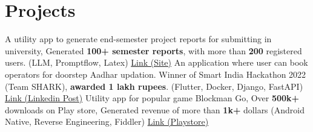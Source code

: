 \section{Projects}
  \resumeSubHeadingListStart
      {A utility app to generate end-semester project reports for submitting in university, Generated \textbf{100+ semester reports}, with more than \textbf{200} registered users. (LLM, Promptflow, Latex) \href{https://tietprojgen.skullzbones.com}{Link (Site)}}
      {An application where user can book operators for doorstep Aadhar updation. Winner of Smart India Hackathon 2022 (Team SHARK), \textbf{awarded 1 lakh rupees}. (Flutter, Docker, Django, FastAPI) \href{https://www.linkedin.com/posts/hsk4link_sih-sih2022-smartindiahackathon-activity-6970324738409672704-YcQA/}{Link (Linkedin Post)}}
      {Utility app for popular game Blockman Go, Over \textbf{500k+} downloads on Play store, Generated revenue of more than \textbf{1k+} dollars (Android Native, Reverse Engineering, Fiddler) \href{https://play.google.com/store/apps/details?id=cf.androefi.xenone}{Link (Playstore)}}

  \resumeSubHeadingListEnd
